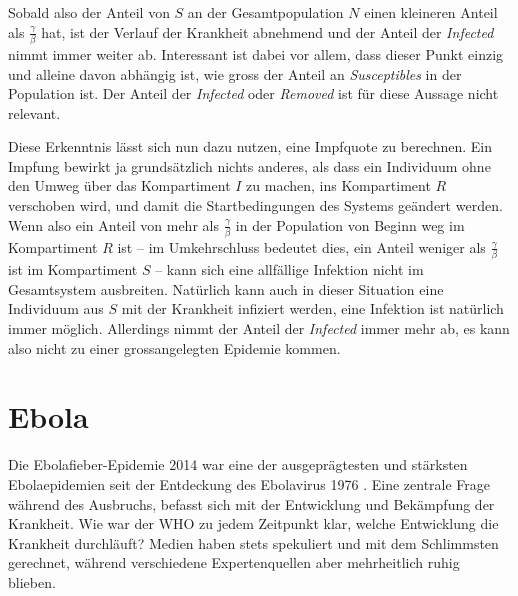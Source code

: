 \begin{refsection}
Sobald also der Anteil von $S$ an der Gesamtpopulation $N$ einen kleineren Anteil als $\frac{\gamma}{\beta}$ hat, ist der Verlauf der Krankheit abnehmend und der Anteil der \emph{Infected} nimmt immer weiter ab.
Interessant ist dabei vor allem, dass dieser Punkt einzig und alleine davon abhängig ist, wie gross der Anteil an \emph{Susceptibles} in der Population ist. 
Der Anteil der \emph{Infected} oder \emph{Removed} ist für diese Aussage nicht relevant. 

Diese Erkenntnis lässt sich nun dazu nutzen, eine Impfquote zu berechnen. 
Ein Impfung bewirkt ja grundsätzlich nichts anderes, als dass ein Individuum ohne den Umweg über das Kompartiment $I$ zu machen, ins Kompartiment $R$ verschoben wird, und damit die Startbedingungen des Systems geändert werden.
Wenn also ein Anteil von mehr als $\frac{\gamma}{\beta}$ in der Population von Beginn weg im Kompartiment $R$ ist -- im Umkehrschluss bedeutet dies, ein Anteil weniger als $\frac{\gamma}{\beta}$ ist im Kompartiment $S$ -- kann sich eine allfällige Infektion nicht im Gesamtsystem ausbreiten.
Natürlich kann auch in dieser Situation eine Individuum aus $S$ mit der Krankheit infiziert werden, eine Infektion ist natürlich immer möglich. 
Allerdings nimmt der Anteil der \emph{Infected} immer mehr ab, es kann also nicht zu einer grossangelegten Epidemie kommen.

\section{Ebola}
Die Ebolafieber-Epidemie 2014  war eine der ausgeprägtesten und stärksten Ebolaepidemien seit der Entdeckung des Ebolavirus 1976 \cite{sir:ebola_history}.
Eine zentrale Frage während des Ausbruchs, befasst sich mit der Entwicklung und Bekämpfung der Krankheit. Wie war der WHO zu jedem Zeitpunkt klar, welche Entwicklung die Krankheit durchläuft?
Medien haben stets spekuliert und mit dem Schlimmsten gerechnet, während verschiedene Expertenquellen aber mehrheitlich ruhig blieben. 


\end{refsection}
